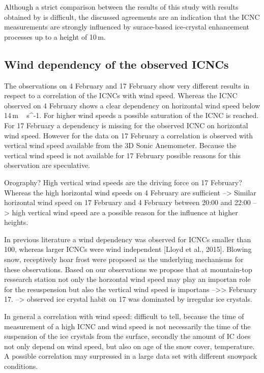 \documentclass[draft,linenumbers]{agujournal}
\begin{document}
Although a strict comparison between the results of this study with results obtained by \citet{Nis05} is difficult, the discussed agreements are an indication that the ICNC measurements are strongly influenced by surace-based ice-crystal enhancement processes up to a height of 10\,\si{m}. 

\subsection{Wind dependency of the observed ICNCs}

The observations on 4 February and 17 February show very different results in respect to a correlation of the ICNCs with wind speed. Whereas the ICNC observed on 4 February shows a clear dependency on horizontal wind speed below 14\,\si{m\,{s^{-1}}}. For higher wind speeds a possible saturation of the ICNC is reached. For 17 February a dependency is missing for the observed ICNC on horizontal wind speed. However for the data on 17 February a correlation is observed with vertical wind speed available from the 3D Sonic Anemometer. Because the vertical wind speed is not available for 17 February possible reasons for this observation are speculative. 

Orography? High vertical wind speeds are the driving force on 17 February? Whereas the high horizontal wind speeds on 4 February are sufficient --> Similar horizontal wind speed on 17 February and 4 February between 20:00 and 22:00 --> high vertical wind speed are a possible reason for the influence at higher heights.

In previous literature a wind dependency was observed for ICNCs smaller than 100, whereas larger ICNCs were wind independent [Lloyd et al., 2015]. Blowing snow, receptively hoar frost were proposed as the underlying mechanisms for these observations. Based on our observations we propose that at mountain-top ressearch station not only the horzontal wind speed may play an importan role for the resuspension but also the vertical wind speed is importans -->> February 17. --> observed ice crystal habit on 17 was dominated by irregular ice crystals.

In general a correlation with wind speed: difficult to tell, because the time of measurement of a high ICNC and wind speed is not necessarily the time of the suspension of the ice crystals from the surface, secondly the amount of IC does not only depend on wind speed, but also on age of the snow cover, temperature. A possible correlation may surpressed in a large data set with different snowpack conditions.
\end{document}
